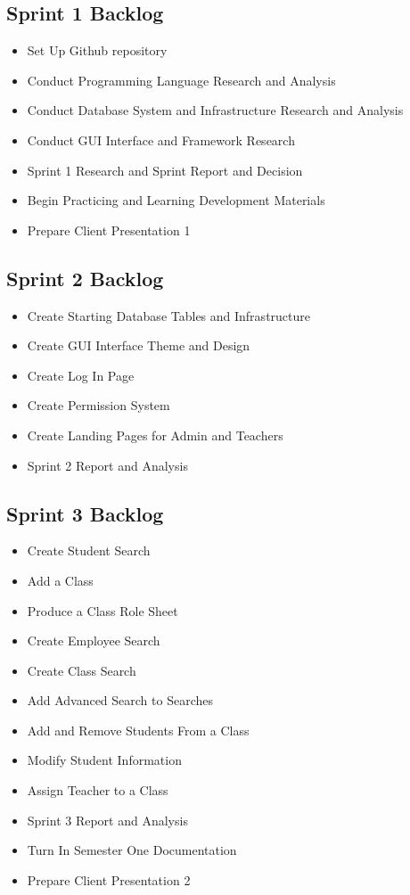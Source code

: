 \subsection{Sprint 1 Backlog}
\begin{itemize}
\item Set Up Github repository
\item Conduct Programming Language Research and Analysis
\item Conduct Database System and Infrastructure Research and Analysis
\item Conduct GUI Interface and Framework Research 
\item Sprint 1 Research and Sprint Report and Decision
\item Begin Practicing and Learning Development Materials
\item Prepare Client Presentation 1
\end{itemize}

\subsection{Sprint 2 Backlog}
\begin{itemize}
\item Create Starting Database Tables and Infrastructure
\item Create GUI Interface Theme and Design
\item Create Log In Page 
\item Create Permission System 
\item Create Landing Pages for Admin and Teachers
\item Sprint 2 Report and Analysis  
\end{itemize}

\subsection{Sprint 3 Backlog}
\begin{itemize}
\item Create Student Search
\item Add a Class
\item Produce a Class Role Sheet
\item Create Employee Search
\item Create Class Search
\item Add Advanced Search to Searches
\item Add and Remove Students From a Class 
\item Modify Student Information
\item Assign Teacher to a Class
\item Sprint 3 Report and Analysis
\item Turn In Semester One Documentation
\item Prepare Client Presentation 2  
\end{itemize}

